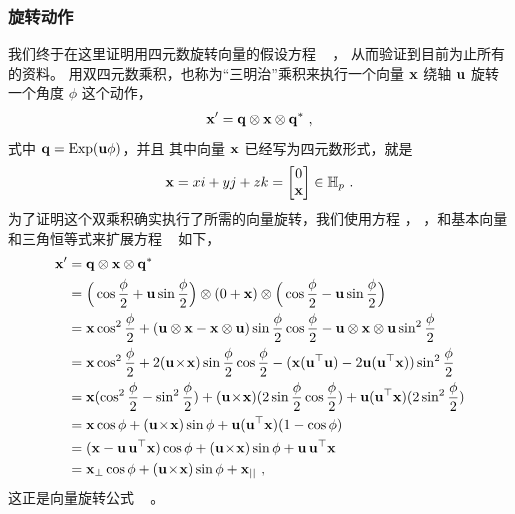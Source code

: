 \subsubsection{旋转动作}
\label{sec:qRotAction}

我们终于在这里证明用四元数旋转向量的假设方程 ~ ，  
从而验证到目前为止所有的资料。
%
用双四元数乘积，也称为“三明治”乘积来执行一个向量 ${\bf x}$ 绕轴 ${\bf u}$ 旋转一个角度 $\phi$ 这个动作，
%
\begin{align}
{\bf x}' = {\bf q}\otimes{\bf x}\otimes{\bf q}^* ~, \label{equ:sandwichProd}
\end{align}
%
式中 ${\bf q}=\operatorname*{Exp}({\bf u}\phi)$，并且
其中向量 ${\bf x}$ 已经写为四元数形式，就是 
%
\begin{align}
{\bf x}= x i + y j + z k = \begin{bmatrix}
0 \\ {\bf x}
\end{bmatrix} \in {\mathbb H}_p
~. \label{equ:quatvec}
\end{align}%
%
%
为了证明这个双乘积确实执行了所需的向量旋转，我们使用方程  ，
，和基本向量和三角恒等式来扩展方程 ~ 如下，
%
\begin{align}\label{equ:quatRotFormula}
\begin{split}
\bfx'
&= \bfq \ot \bfx \ot \bfq^* \\
&= \Big(\cos \frac{\phi}{2} + \bfu \sin \frac{\phi}{2}\Big)
 \ot (0+\bfx)
 \ot \Big(\cos \frac{\phi}{2} - \bfu \sin \frac{\phi}{2}\Big)
 \\
&= \bfx \cos^2 \frac{\phi}{2} + (\bfu\ot\bfx - \bfx\ot\bfu) \sin \frac{\phi}{2} \cos \frac{\phi}{2} - \bfu\ot\bfx\ot\bfu \sin^2 \frac{\phi}{2} \\
&= \bfx \cos^2 \frac{\phi}{2} + 2 (\bfu \tcross \bfx) \sin \frac{\phi}{2} \cos \frac{\phi}{2} - (\bfx (\bfu \tr \bfu) - 2 \bfu (\bfu \tr \bfx)) \sin^2 \frac{\phi}{2} \\
&= \bfx (\cos^2 \frac{\phi}{2} - \sin^2 \frac{\phi}{2}) + (\bfu \tcross \bfx) (2\sin\frac{\phi}{2} \cos\frac{\phi}{2}) + \bfu (\bfu \tr \bfx) (2\sin^2 \frac{\phi}{2}) \\
&= \bfx \cos \phi + (\bfu \tcross \bfx) \sin \phi + \bfu (\bfu \tr \bfx) (1 - \cos \phi) \\
&= (\bfx - \bfu \,\bfu \tr \bfx) \cos \phi + (\bfu \tcross \bfx) \sin \phi + \bfu \,\bfu \tr \bfx \\
&= \bfx_{\bot} \cos \phi + (\bfu \tcross \bfx) \sin \phi + \bfx_{||} ~,
\end{split}
\end{align}%
%
这正是向量旋转公式 ~ 。


